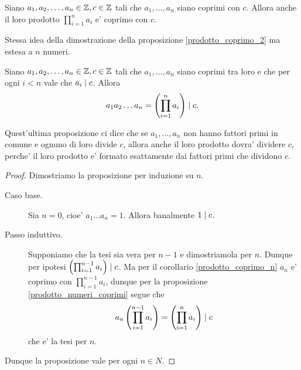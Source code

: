 \begin{corollary} \label{prodotto_coprimo_n}
    Siano $a_1, a_2, \dots, a_n \in \mathbb{Z}, c \in \mathbb{Z}$ tali che $a_1, \dots, a_n$ siano coprimi con $c$. Allora anche il loro prodotto $\prod_{i = 1}^{n} a_i$ e' coprimo con $c$.
\end{corollary}
\begin{intuition}
    Stessa idea della dimostrazione della proposizione \ref{prodotto_coprimo_2} ma estesa a $n$ numeri.
\end{intuition}

\begin{proposition}
    Siano $a_1, a_2, \dots, a_n \in \mathbb{Z}, c \in \mathbb{Z}$ tali che $a_1, \dots, a_n$ siano coprimi tra loro e che per ogni $i<n$ vale che $a_i \mid c$.
    Allora \begin{equation}
        a_1a_2\dots a_n = \left( \prod_{i = 1}^n a_i \right) \mid c.
    \end{equation}
\end{proposition}
\begin{intuition}
    Quest'ultima proposizione ci dice che se $a_1, \dots, a_n$ non hanno fattori primi in comune e ognuno di loro divide $c$, allora anche il loro prodotto dovra' dividere $c$, perche' il loro prodotto e' formato esattamente dai fattori primi che dividono $c$.
\end{intuition}
\begin{proof}
    Dimostriamo la proposizione per induzione su $n$.
    \begin{description}
        \item[Caso base.] 
        Sia $n = 0$, cioe' $a_1\dots a_n = 1$. Allora banalmente $1 \mid c$.
        \item[Passo induttivo.]         
        Supponiamo che la tesi sia vera per $n-1$ e dimostriamola per $n$. Dunque per ipotesi $ \left(\prod_{i = 1}^{n - 1} a_i\right) \mid c$.
        Ma per il corollario \ref{prodotto_coprimo_n} $a_n$ e' coprimo con $\prod_{i = 1}^{n - 1} a_i$, dunque per la proposizione \ref{prodotto_numeri_coprimi} segue che
        \begin{equation*}
            a_n \left(\prod_{i = 1}^{n - 1} a_i\right) = \left( \prod_{i = 1}^{n} a_i \right) \mid c
        \end{equation*}
        che e' la tesi per $n$.
    \end{description}
    Dunque la proposizione vale per ogni $n \in N$.
\end{proof}


